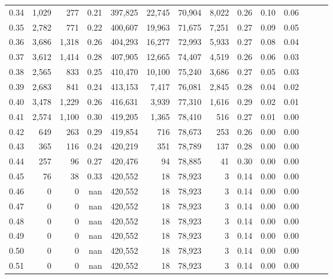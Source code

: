 \begin{tabular}{rrrrrrrrrrrrrr}
0.34 &   1,029 &     277 &  0.21 &  397,825 &   22,745 &  70,904 &   8,022 &  0.26 &  0.10 &      0.06 \\
0.35 &   2,782 &     771 &  0.22 &  400,607 &   19,963 &  71,675 &   7,251 &  0.27 &  0.09 &      0.05 \\
0.36 &   3,686 &   1,318 &  0.26 &  404,293 &   16,277 &  72,993 &   5,933 &  0.27 &  0.08 &      0.04 \\
0.37 &   3,612 &   1,414 &  0.28 &  407,905 &   12,665 &  74,407 &   4,519 &  0.26 &  0.06 &      0.03 \\
0.38 &   2,565 &     833 &  0.25 &  410,470 &   10,100 &  75,240 &   3,686 &  0.27 &  0.05 &      0.03 \\
0.39 &   2,683 &     841 &  0.24 &  413,153 &    7,417 &  76,081 &   2,845 &  0.28 &  0.04 &      0.02 \\
0.40 &   3,478 &   1,229 &  0.26 &  416,631 &    3,939 &  77,310 &   1,616 &  0.29 &  0.02 &      0.01 \\
0.41 &   2,574 &   1,100 &  0.30 &  419,205 &    1,365 &  78,410 &     516 &  0.27 &  0.01 &      0.00 \\
0.42 &     649 &     263 &  0.29 &  419,854 &      716 &  78,673 &     253 &  0.26 &  0.00 &      0.00 \\
0.43 &     365 &     116 &  0.24 &  420,219 &      351 &  78,789 &     137 &  0.28 &  0.00 &      0.00 \\
0.44 &     257 &      96 &  0.27 &  420,476 &       94 &  78,885 &      41 &  0.30 &  0.00 &      0.00 \\
0.45 &      76 &      38 &  0.33 &  420,552 &       18 &  78,923 &       3 &  0.14 &  0.00 &      0.00 \\
0.46 &       0 &       0 &   nan &  420,552 &       18 &  78,923 &       3 &  0.14 &  0.00 &      0.00 \\
0.47 &       0 &       0 &   nan &  420,552 &       18 &  78,923 &       3 &  0.14 &  0.00 &      0.00 \\
0.48 &       0 &       0 &   nan &  420,552 &       18 &  78,923 &       3 &  0.14 &  0.00 &      0.00 \\
0.49 &       0 &       0 &   nan &  420,552 &       18 &  78,923 &       3 &  0.14 &  0.00 &      0.00 \\
0.50 &       0 &       0 &   nan &  420,552 &       18 &  78,923 &       3 &  0.14 &  0.00 &      0.00 \\
0.51 &       0 &       0 &   nan &  420,552 &       18 &  78,923 &       3 &  0.14 &  0.00 &      0.00 \\

\end{tabular}

